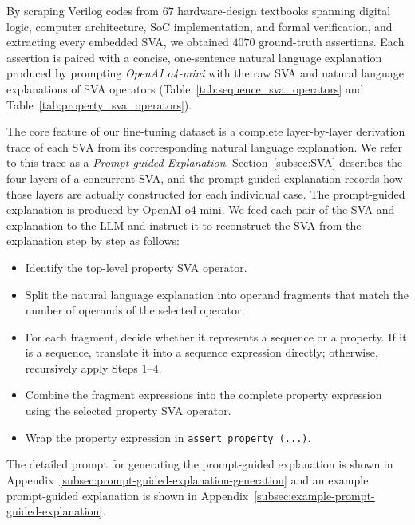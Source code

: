 By scraping Verilog codes from $67$ hardware-design textbooks spanning digital logic, computer architecture, SoC implementation, and formal verification, and extracting every embedded SVA, we obtained $4070$ ground-truth assertions.
Each assertion is paired with a concise, one-sentence natural language explanation produced by prompting \textit{OpenAI o4-mini} with the raw SVA and natural language explanations of SVA operators (Table~\ref{tab:sequence_sva_operators} and Table~\ref{tab:property_sva_operators}).

The core feature of our fine-tuning dataset is a complete layer-by-layer derivation trace of each SVA from its corresponding natural language explanation. 
We refer to this trace as a \textit{Prompt-guided Explanation}. 
Section~\ref{subsec:SVA} describes the four layers of a concurrent SVA, and the prompt-guided explanation records how those layers are actually constructed for each individual case. 
The prompt-guided explanation is produced by OpenAI o4-mini. We feed each pair of the SVA and explanation to the LLM and instruct it to reconstruct the SVA from the explanation step by step as follows:
\begin{itemize}
    \item [(1)] Identify the top-level property SVA operator.
    \item [(2)] Split the natural language explanation into operand fragments that match the number of operands of the selected operator;
    \item [(3)] For each fragment, decide whether it represents a sequence or a property. If it is a sequence, translate it into a sequence expression directly; otherwise, recursively apply Steps $1$--$4$.
    \item [(4)] Combine the fragment expressions into the complete property expression using the selected property SVA operator.
    \item [(5)] Wrap the property expression in \texttt{assert property (...)}.
\end{itemize}
The detailed prompt for generating the prompt-guided explanation is shown in Appendix~\ref{subsec:prompt-guided-explanation-generation} and an example prompt-guided explanation is shown in Appendix~\ref{subsec:example-prompt-guided-explanation}.
